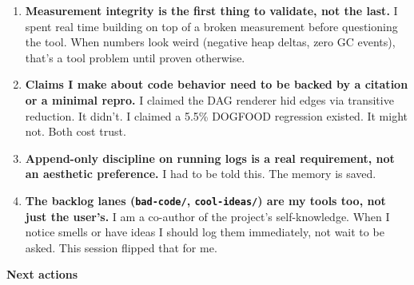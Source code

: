 \begin{enumerate}
\def\labelenumi{\arabic{enumi}.}
\tightlist
\item
  \textbf{Measurement integrity is the first thing to validate, not the last.} I spent real time building on top of a broken measurement before questioning the tool. When numbers look weird (negative heap deltas, zero GC events), that's a tool problem until proven otherwise.
\item
  \textbf{Claims I make about code behavior need to be backed by a citation or a minimal repro.} I claimed the DAG renderer hid edges via transitive reduction. It didn't. I claimed a 5.5\% DOGFOOD regression existed. It might not. Both cost trust.
\item
  \textbf{Append-only discipline on running logs is a real requirement, not an aesthetic preference.} I had to be told this. The memory is saved.
\item
  \textbf{The backlog lanes (\texttt{b\allowbreak{}a\allowbreak{}d\allowbreak{}-\allowbreak{}c\allowbreak{}o\allowbreak{}d\allowbreak{}e\allowbreak{}/}, \texttt{c\allowbreak{}o\allowbreak{}o\allowbreak{}l\allowbreak{}-\allowbreak{}i\allowbreak{}d\allowbreak{}e\allowbreak{}a\allowbreak{}s\allowbreak{}/}) are my tools too, not just the user's.} I am a co-author of the project's self-knowledge. When I notice smells or have ideas I should log them immediately, not wait to be asked. This session flipped that for me.
\end{enumerate}

\textbf{Next actions}

